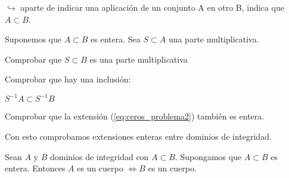 	\notacion $\hookrightarrow$ aparte de indicar una aplicación de un conjunto A en otro B, indica que $A \subset B$.

	\begin{problem}
		Suponemos que $A \subset B$ es entera.
		Sea $S \subset A$ una parte multiplicativa.

		\ppart Comprobar que $S \subset B$ es una parte multiplicativa

		\ppart Comprobar que hay una inclusión:

			\(S^{-1} A \subset S^{-1}B \label{eq:ceros_problema2} \)

		\ppart Comprobar que la extensión (\ref{eq:ceros_problema2}) también es entera.

		\solution
	\end{problem}

	Con esto comprobamos extensiones enteras entre dominios de integridad.

	\begin{theorem}
		Sean $A$ y $B$ dominios de integridad con $A \subset B$. Supongamos que $A \subset B$ es entera. Entonces $A$ es un cuerpo $\Leftrightarrow B$ es un cuerpo.
	\end{theorem}

